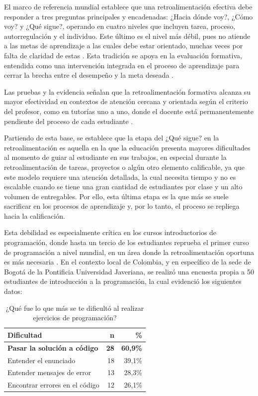 \documentclass[letterpaper, 10 pt, conference]{ieeeconf}
\begin{document}
El marco de referencia mundial establece que una retroalimentación efectiva debe responder a tres preguntas principales y encadenadas: ¿Hacia dónde voy?, ¿Cómo voy? y ¿Qué sigue?, operando en cuatro niveles que incluyen tarea, proceso, autorregulación y el individuo. Este último es el nivel más débil, pues no atiende a las metas de aprendizaje a las cuales debe estar orientado, muchas veces por falta de claridad de estas \cite{5}. Esta tradición se apoya en la evaluación formativa, entendida como una intervención integrada en el proceso de aprendizaje para cerrar la brecha entre el desempeño y la meta deseada \cite{5}\cite{6}. 

Las pruebas y la evidencia señalan que la retroalimentación formativa alcanza su mayor efectividad en contextos de atención cercana y orientada según el criterio del profesor, como en tutorías uno a uno, donde el docente está permanentemente pendiente del proceso de cada estudiante \cite{7}. 

Partiendo de esta base, se establece que la etapa del ¿Qué sigue? en la retroalimentación es aquella en la que la educación presenta mayores dificultades al momento de guiar al estudiante en sus trabajos, en especial durante la retroalimentación de tareas, proyectos o algún otro elemento calificable, ya que este modelo requiere una atención detallada, la cual necesita tiempo y no es escalable cuando se tiene una gran cantidad de estudiantes por clase y un alto volumen de entregables. Por ello, esta última etapa es la que más se suele sacrificar en los procesos de aprendizaje y, por lo tanto, el proceso se repliega hacia la calificación. 

Esta debilidad es especialmente crítica en los cursos introductorios de programación, donde hasta un tercio de los estudiantes reprueba el primer curso de programación a nivel mundial, en un área donde la retroalimentación oportuna es más necesaria \cite{24}. En el contexto local de Colombia, y en específico de la sede de Bogotá de la Pontificia Universidad Javeriana, se realizó una encuesta propia a 50 estudiantes de introducción a la programación, la cual evidenció los siguientes datos:

\begin{table}[ht]
	\centering
	\caption{¿Qué fue lo que más se te dificultó al realizar ejercicios de programación?}
	\label{tab:dificultades}
	\begin{tabular}{lrr}
		\hline
		\textbf{Dificultad} & \textbf{n} & \textbf{\%} \\
		\hline
		\textbf{Pasar la solución a código} & \textbf{28} & \textbf{60,9\%} \\
		Entender el enunciado & 18 & 39,1\% \\
		Entender mensajes de error & 13 & 28,3\% \\
		Encontrar errores en el código & 12 & 26,1\% \\
		\hline
	\end{tabular}
\end{table}
\end{document}
